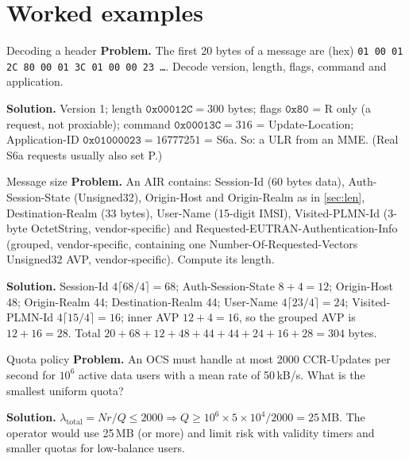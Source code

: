 \documentclass[11pt,a4paper]{article}
\begin{document}
\begin{acnfigure}
  \caption{Rx and Gx dialogues for a VoLTE call (\cref{proc:volte}).}
  \label{fig:volte}
\end{acnfigure}

\section{Worked examples}

\begin{examplebox}{Decoding a header}\label{ex:decode}
\textbf{Problem.} The first 20 bytes of a message are (hex)
\texttt{01 00 01 2C 80 00 01 3C 01 00 00 23 \ldots}. Decode version, length, flags, command and application.

\textbf{Solution.} Version 1; length $\mathtt{0x00012C} = 300$ bytes; flags $\mathtt{0x80}$ = R only (a request,
not proxiable); command $\mathtt{0x00013C} = 316$ = Update-Location; Application-ID $\mathtt{0x01000023} =
16777251$ = S6a. So: a ULR from an MME. (Real S6a requests usually also set P.)
\end{examplebox}

\begin{examplebox}{Message size}\label{ex:size}
\textbf{Problem.} An AIR contains: Session-Id (60 bytes data), Auth-Session-State (Unsigned32), Origin-Host and
Origin-Realm as in \cref{sec:len}, Destination-Realm (33 bytes), User-Name (15-digit IMSI), Visited-PLMN-Id
(3-byte OctetString, vendor-specific) and Requested-EUTRAN-Authentication-Info (grouped, vendor-specific,
containing one Number-Of-Requested-Vectors Unsigned32 AVP, vendor-specific). Compute its length.

\textbf{Solution.} Session-Id $4\lceil68/4\rceil = 68$; Auth-Session-State $8+4 = 12$; Origin-Host 48;
Origin-Realm 44; Destination-Realm 44; User-Name $4\lceil23/4\rceil = 24$; Visited-PLMN-Id $4\lceil15/4\rceil
= 16$; inner AVP $12+4 = 16$, so the grouped AVP is $12+16 = 28$. Total $20 + 68+12+48+44+44+24+16+28 = 304$
bytes.
\end{examplebox}

\begin{examplebox}{Quota policy}\label{ex:quota}
\textbf{Problem.} An OCS must handle at most 2000 CCR-Updates per second for $10^6$ active data users with a
mean rate of 50\,kB/s. What is the smallest uniform quota?

\textbf{Solution.} $\lambda_{\mathrm{total}} = N r/Q \le 2000 \Rightarrow Q \ge 10^6\times5\times10^4/2000 =
25$\,MB. The operator would use 25\,MB (or more) and limit risk with validity timers and smaller quotas for
low-balance users.
\end{examplebox}
\end{document}
